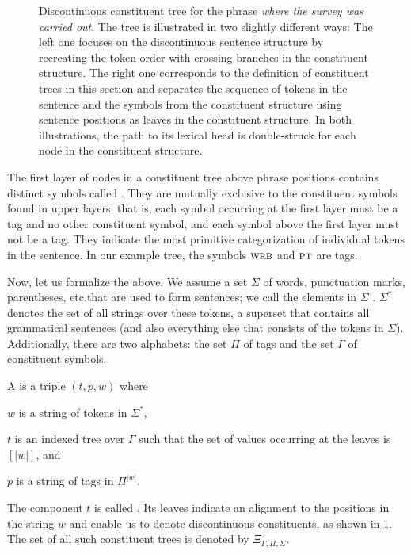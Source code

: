 \documentclass[../document.tex]{subfiles}
\begin{document}
    \begin{figure}
        \null\hfill
        
        \hfill\null

        \caption{\label{fig:pre:ctree}
            Discontinuous constituent tree for the phrase \emph{where the survey was carried out}.
            The tree is illustrated in two slightly different ways:
                The left one focuses on the discontinuous sentence structure by recreating the token order with crossing branches in the constituent structure.
                The right one corresponds to the definition of constituent trees in this section and separates the sequence of tokens in the sentence and the  symbols from the constituent structure using sentence positions as leaves in the constituent structure.
            In both illustrations, the path to its lexical head is double-struck for each node in the constituent structure.
        }
    \end{figure}

    The first layer of nodes in a constituent tree above phrase positions contains distinct symbols called  .
    They are mutually exclusive to the constituent symbols found in upper layers; that is, each symbol occurring at the first layer must be a  tag and no other constituent symbol, and each symbol above the first layer must not be a  tag.
    They indicate the most primitive categorization of individual tokens in the sentence.
    In our example tree, the symbols \(\textsc{wrb}\) and \(\textsc{pt}\) are  tags.

    Now, let us formalize the above.
    We assume a set \(\varSigma\) of words, punctuation marks, parentheses, etc.\@ that are used to form sentences; we call the elements in \(\varSigma\) .
    \(\varSigma^*\) denotes the set of all strings over these tokens, a superset that contains all grammatical sentences (and also everything else that consists of the tokens in \(\varSigma\)).
    Additionally, there are two alphabets: the set \(\varPi\) of  tags and the set \(\varGamma\) of constituent symbols.

    A  is a triple \((t, p, w)\) where
    \begin{compactitem}
        \item \(w\) is a string of tokens in \(\varSigma^*\),
        \item \(t\) is an indexed tree over \(\varGamma\) such that the set of values occurring at the leaves is \([|w|]\), and
        \item \(p\) is a string of  tags in \(\varPi^{|w|}\).
    \end{compactitem}
    The component \(t\) is called .
    Its leaves indicate an alignment to the positions in the string \(w\) and enable us to denote discontinuous constituents, as shown in \cref{fig:pre:ctree}.
    The set of all such constituent trees is denoted by \(\Xi_{\varGamma, \varPi, \varSigma}\).
\end{document}
